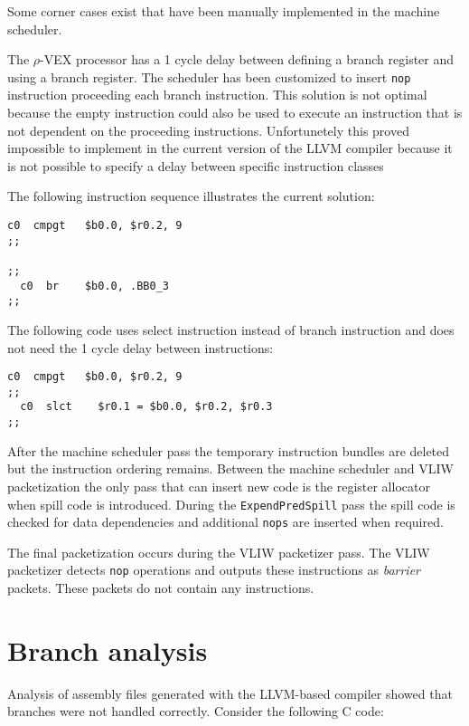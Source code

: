 Some corner cases exist that have been manually implemented in the machine scheduler.

The $\rho$-VEX processor has a 1 cycle delay between defining a branch register and using a branch register. The scheduler has been customized to insert \texttt{nop} instruction proceeding each branch instruction. This solution is not optimal because the empty instruction could also be used to execute an instruction that is not dependent on the proceeding instructions. Unfortunetely this proved impossible to implement in the current version of the LLVM compiler because it is not possible to specify a delay between specific instruction classes

The following instruction sequence illustrates the current solution: 

\begin{lstlisting}[language=rvex]
  c0  cmpgt   $b0.0, $r0.2, 9
;;

;;
  c0  br    $b0.0, .BB0_3
;;
\end{lstlisting}

The following code uses select instruction instead of branch instruction and does not need the 1 cycle delay between instructions:

\begin{lstlisting}[language=rvex]
  c0  cmpgt   $b0.0, $r0.2, 9
;;
  c0  slct    $r0.1 = $b0.0, $r0.2, $r0.3 
;;
\end{lstlisting}

After the machine scheduler pass the temporary instruction bundles are deleted but the instruction ordering remains. Between the machine scheduler and VLIW packetization the only pass that can insert new code is the register allocator when spill code is introduced. During the \texttt{ExpendPredSpill} pass the spill code is checked for data dependencies and additional \texttt{nops} are inserted when required.

The final packetization occurs during the VLIW packetizer pass. The VLIW packetizer detects \texttt{nop} operations and outputs these instructions as \emph{barrier} packets. These packets do not contain any instructions.



\section{Branch analysis}
Analysis of assembly files generated with the LLVM-based compiler showed that branches were not handled correctly. Consider the following C code:

